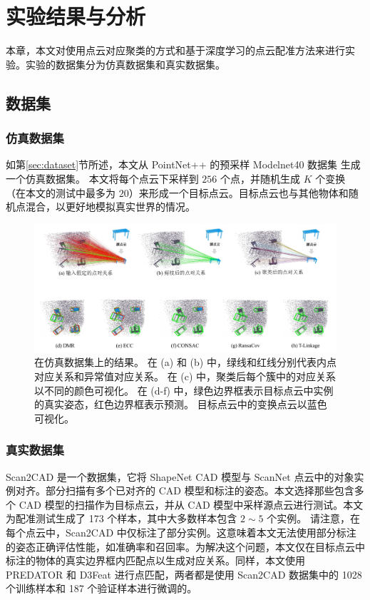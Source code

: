 \chapter{实验结果与分析}
本章，本文对使用点云对应聚类的方式和基于深度学习的点云配准方法来进行实验。实验的数据集分为仿真数据集和真实数据集。
\section{数据集}
\subsection{仿真数据集}
如第\ref{sec:dataset}节所述，本文从 PointNet++ \cite{qi2017pointnet++} 的预采样 Modelnet40 数据集\cite{sunmodelnet40} 生成一个仿真数据集。
本文将每个点云下采样到 $256$ 个点，并随机生成 $K$ 个变换（在本文的测试中最多为 $20$）来形成一个目标点云。目标点云也与其他物体和随机点混合，以更好地模拟真实世界的情况。

\begin{figure}
        \centering
        \includegraphics[width=1.0\textwidth]{images/DMR_syn.pdf}
        \caption{
                在仿真数据集上的结果。
                在 (a) 和 (b) 中，绿线和红线分别代表内点对应关系和异常值对应关系。
                在 (c) 中，聚类后每个簇中的对应关系以不同的颜色可视化。
                在 (d-f) 中，绿色边界框表示目标点云中实例的真实姿态，红色边界框表示预测。
                目标点云中的变换点云以蓝色可视化。
        }
        \label{fig:DMR}
\end{figure}

\subsection{真实数据集}
Scan2CAD\cite{avetisyan2019scan2cad} 是一个数据集，它将 ShapeNet\cite{chang2015shapenet} CAD 模型与 ScanNet\cite{dai2017scannet} 点云中的对象实例对齐。部分扫描有多个已对齐的 CAD 模型和标注的姿态。本文选择那些包含多个 CAD 模型的扫描作为目标点云，并从 CAD 模型中采样源点云进行测试。本文为配准测试生成了 173 个样本，其中大多数样本包含 $2 \sim 5$ 个实例。
请注意，在每个点云中，Scan2CAD 中仅标注了部分实例。这意味着本文无法使用部分标注的姿态正确评估性能，如准确率和召回率。为解决这个问题，本文仅在目标点云中标注的物体的真实边界框内匹配点以生成对应关系。同样，本文使用 PREDATOR\cite{huang2021predator} 和 D3Feat\cite{bai2020d3feat} 进行点匹配，两者都是使用 Scan2CAD 数据集中的 1028 个训练样本和 187 个验证样本进行微调的。

